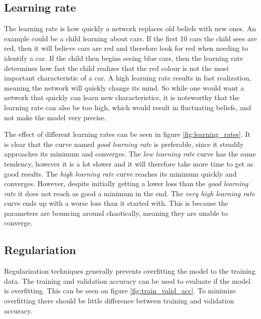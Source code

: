\subsection{Learning rate}
The learning rate is how quickly a network replaces old beliefs with new ones. An example could be a child learning about cars. If the first 10 cars the child sees are red, then it will believe cars are red and therefore look for red when needing to identify a car. If the child then begins seeing blue cars, then the learning rate determines how fast the child realizes that the red colour is not the most important characteristic of a car. A high learning rate results in fast realization, meaning the network will quickly change its mind. So while one would want a network that quickly can learn new characteristics, it is noteworthy that the learning rate can also be too high, which would result in fluctuating beliefs, and not make the model very precise. 


The effect of different learning rates can be seen in figure \ref{fig:learning_rates}. It is clear that the curve named \emph{good learning rate} is preferable, since it steadily approaches its minimum and converges. The \emph{low learning rate} curve has the same tendency, however it is a lot slower and it will therefore take more time to get as good results. The \emph{high learning rate} curve reaches its minimum quickly and converges. However, despite initially getting a lower loss than the \emph{good learning rate} it does not reach as good a minimum in the end. The \emph{very high learning rate} curve ends up with a worse loss than it started with. This is because the parameters are bouncing around chaotically, meaning they are unable to converge. 

\subsection{Regulariation}
Regularization techniques generally prevents overfitting the model to the training data. The training and validation accuracy can be used to evaluate if the model is overfitting. This can be seen on figure \ref{fig:train_valid_acc}. To minimize overfitting there should be little difference between training and validation accuracy.



